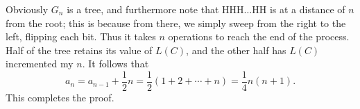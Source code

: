 Obviously $G_n$ is a tree, and furthermore note that $\text{HHH}\ldots\text{HH}$ is at a distance of $n$ from the root; this is because from there, we simply sweep from the right to the left, flipping each bit. Thus it takes $n$ operations to reach the end of the process. Half of the tree retains its value of $L(C)$, and the other half has $L(C)$ incremented my $n$. It follows that \[a_n=a_{n-1}+\frac12n=\frac12(1+2+\cdots+n)=\frac14n(n+1).\]
This completes the proof.
